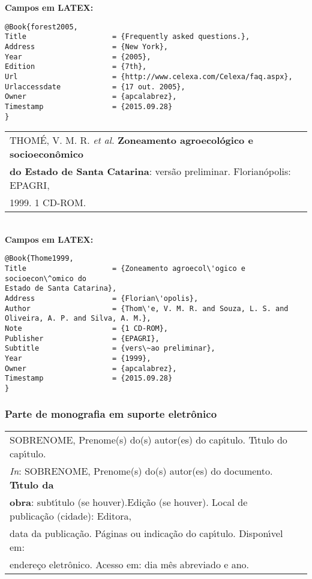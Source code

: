 \textbf{Campos em LATEX:} 

\begin{verbatim}
@Book{forest2005,
Title                    = {Frequently asked questions.},
Address                  = {New York},
Year                     = {2005},
Edition                  = {7th},
Url                      = {http://www.celexa.com/Celexa/faq.aspx},
Urlaccessdate            = {17 out. 2005},
Owner                    = {apcalabrez},
Timestamp                = {2015.09.28}
}
\end{verbatim}


\begin{tabular}{|l|c|} \hline
	THOM\'E, V. M. R. \textit{et al.} \textbf{Zoneamento agroecol\'ogico e socioecon\^omico} \\ \textbf{do Estado de Santa Catarina}:  vers\~ao preliminar. Florian\'opolis: EPAGRI, \\
	1999. 1 CD-ROM.  \\\hline
\end{tabular} \\ 

\textbf{Campos em LATEX:} 

\begin{verbatim}
@Book{Thome1999,
Title                    = {Zoneamento agroecol\'ogico e socioecon\^omico do 
Estado de Santa Catarina},
Address                  = {Florian\'opolis},
Author                   = {Thom\'e, V. M. R. and Souza, L. S. and 
Oliveira, A. P. and Silva, A. M.},
Note                     = {1 CD-ROM},
Publisher                = {EPAGRI},
Subtitle                 = {vers\~ao preliminar},
Year                     = {1999},
Owner                    = {apcalabrez},
Timestamp                = {2015.09.28}
}
\end{verbatim}


 \subsubsection{Parte de monografia em suporte eletr\^onico}
	 
	 \begin{tabular}{|l|c|} \hline
	 	SOBRENOME, Prenome(s) do(s) autor(es) do cap\'{\i}tulo. T\'{\i}tulo do cap\'{\i}tulo. \\ \textit{In}:
	 	SOBRENOME, Prenome(s)  do(s) autor(es) do documento.  \textbf{T\'{\i}tulo da} \\ \textbf{obra}: subt\'{\i}tulo (se houver).Edi\c{c}\~ao (se houver). Local de publica\c{c}\~ao (cidade): Editora, \\ data da publica\c{c}\~ao. P\'aginas ou indica\c{c}\~ao do cap\'{\i}tulo. Dispon\'{\i}vel em: \\ endere\c{c}o eletr\^onico. Acesso em: dia m\^es abreviado e ano.  \\\hline
	 \end{tabular} \\ 
	 

